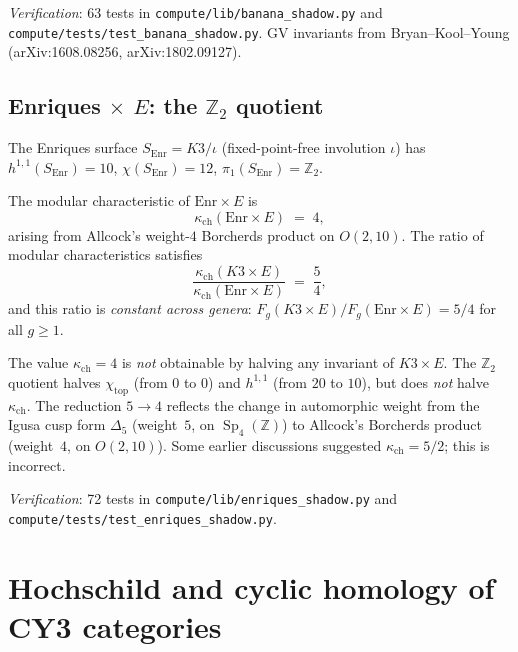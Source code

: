 \documentclass[11pt]{article}
\newcommand{\Z}{\mathbb{Z}}
\newcommand{\Sp}{\operatorname{Sp}}
\begin{document}
\noindent\textit{Verification}: 63 tests in
\texttt{compute/lib/banana\_shadow.py}
and \texttt{compute/tests/test\_banana\_shadow.py}.
GV invariants from Bryan--Kool--Young
(arXiv:1608.08256, arXiv:1802.09127).

\subsection{Enriques $\times$ $E$: the $\Z_2$ quotient}
\label{subsec:enriques}

The Enriques surface $S_{\mathrm{Enr}} = K3/\iota$
(fixed-point-free involution $\iota$) has
$h^{1,1}(S_{\mathrm{Enr}}) = 10$, $\chi(S_{\mathrm{Enr}}) = 12$,
$\pi_1(S_{\mathrm{Enr}}) = \Z_2$.

\begin{proposition}
\label{prop:enriques-kappa}
The modular characteristic of $\mathrm{Enr} \times E$ is
\[
 \kappa_{\mathrm{ch}}(\mathrm{Enr} \times E) \;=\; 4,
\]
arising from Allcock's weight-$4$ Borcherds product on $O(2,10)$.
The ratio of modular characteristics satisfies
\[
 \frac{\kappa_{\mathrm{ch}}(K3 \times E)}{\kappa_{\mathrm{ch}}(\mathrm{Enr} \times E)}
 \;=\; \frac{5}{4},
\]
and this ratio is \emph{constant across genera}:
$F_g(K3 \times E) / F_g(\mathrm{Enr} \times E) = 5/4$
for all $g \geq 1$.
\end{proposition}

\begin{remark}
The value $\kappa_{\mathrm{ch}} = 4$ is \emph{not} obtainable by halving any
invariant of $K3 \times E$. The $\Z_2$ quotient
halves $\chi_{\mathrm{top}}$ (from $0$ to $0$) and
$h^{1,1}$ (from $20$ to $10$), but does \emph{not}
halve~$\kappa_{\mathrm{ch}}$. The reduction $5 \to 4$ reflects
the change in automorphic weight from the Igusa cusp form
$\Delta_5$ (weight~$5$, on $\Sp_4(\Z)$) to Allcock's
Borcherds product (weight~$4$, on $O(2,10)$).
Some earlier discussions suggested $\kappa_{\mathrm{ch}} = 5/2$;
this is incorrect.
\end{remark}

\noindent\textit{Verification}: 72 tests in
\texttt{compute/lib/enriques\_shadow.py}
and \texttt{compute/tests/test\_enriques\_shadow.py}.

\section{Hochschild and cyclic homology of CY3 categories}
\label{sec:hh-hc}
\end{document}
